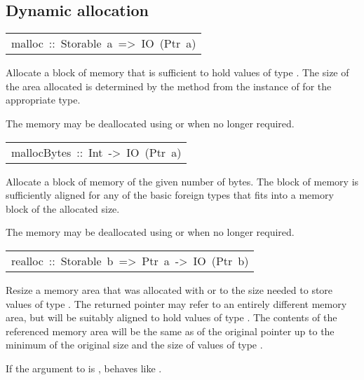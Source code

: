 \subsection{Dynamic allocation
}
\begin{haddockdesc}
\item[\begin{tabular}{@{}l}
malloc\ ::\ Storable\ a\ =>\ IO\ (Ptr\ a)
\end{tabular}]\haddockbegindoc
Allocate a block of memory that is sufficient to hold values of type
 .  The size of the area allocated is determined by the 
 method from the instance of  for the appropriate type.
\par
The memory may be deallocated using  or  when
 no longer required.
\par

\end{haddockdesc}
\begin{haddockdesc}
\item[\begin{tabular}{@{}l}
mallocBytes\ ::\ Int\ ->\ IO\ (Ptr\ a)
\end{tabular}]\haddockbegindoc
Allocate a block of memory of the given number of bytes.
 The block of memory is sufficiently aligned for any of the basic
 foreign types that fits into a memory block of the allocated size.
\par
The memory may be deallocated using  or  when
 no longer required.
\par

\end{haddockdesc}
\begin{haddockdesc}
\item[\begin{tabular}{@{}l}
realloc\ ::\ Storable\ b\ =>\ Ptr\ a\ ->\ IO\ (Ptr\ b)
\end{tabular}]\haddockbegindoc
Resize a memory area that was allocated with  or 
 to the size needed to store values of type .  The returned pointer
 may refer to an entirely different memory area, but will be suitably
 aligned to hold values of type .  The contents of the referenced
 memory area will be the same as of the original pointer up to the
 minimum of the original size and the size of values of type .
\par
If the argument to  is ,  behaves like
 .
\par

\end{haddockdesc}
